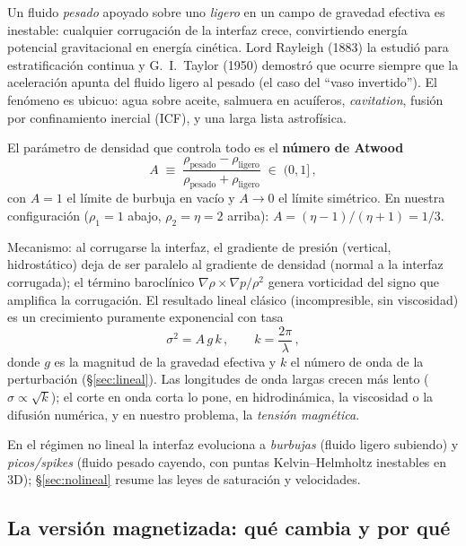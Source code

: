 \documentclass[11pt,a4paper]{article}
\begin{document}
Un fluido \emph{pesado} apoyado sobre uno \emph{ligero} en un campo de gravedad efectiva es
inestable: cualquier corrugación de la interfaz crece, convirtiendo energía potencial
gravitacional en energía cinética. Lord Rayleigh (1883) la estudió para estratificación
continua y G.\ I.\ Taylor (1950) demostró que ocurre siempre que la aceleración apunta del
fluido ligero al pesado (el caso del ``vaso invertido''). El fenómeno es ubicuo: agua sobre
aceite, salmuera en acuíferos, \emph{cavitation}, fusión por confinamiento inercial (ICF),
y una larga lista astrofísica.

El parámetro de densidad que controla todo es el \textbf{número de Atwood}
\begin{equation}
A \;\equiv\; \frac{\rho_\mathrm{pesado}-\rho_\mathrm{ligero}}{\rho_\mathrm{pesado}+\rho_\mathrm{ligero}}
\;\in\; (0,1]\,,
\label{eq:atwood}
\end{equation}
con $A=1$ el límite de burbuja en vacío y $A\to 0$ el límite simétrico. En nuestra
configuración ($\rho_1=1$ abajo, $\rho_2=\eta=2$ arriba): $A=(\eta-1)/(\eta+1)=1/3$.

Mecanismo: al corrugarse la interfaz, el gradiente de presión (vertical, hidrostático) deja
de ser paralelo al gradiente de densidad (normal a la interfaz corrugada); el término
baroclínico $\nabla\rho\times\nabla p / \rho^2$ genera vorticidad del signo que amplifica la
corrugación. El resultado lineal clásico (incompresible, sin viscosidad) es un crecimiento
puramente exponencial con tasa
\begin{equation}
\sigma^2 = A\,g\,k\,,
\qquad k=\frac{2\pi}{\lambda}\,,
\label{eq:rt-hd}
\end{equation}
donde $g$ es la magnitud de la gravedad efectiva y $k$ el número de onda de la perturbación
(§\ref{sec:lineal}). Las longitudes de onda largas crecen más lento ($\sigma\propto\sqrt{k}$);
el corte en onda corta lo pone, en hidrodinámica, la viscosidad o la difusión numérica, y en
nuestro problema, la \emph{tensión magnética}.

En el régimen no lineal la interfaz evoluciona a \emph{burbujas} (fluido ligero subiendo) y
\emph{picos/spikes} (fluido pesado cayendo, con puntas Kelvin--Helmholtz inestables en 3D);
\S\ref{sec:nolineal} resume las leyes de saturación y velocidades.

\subsection{La versión magnetizada: qué cambia y por qué}
\end{document}
